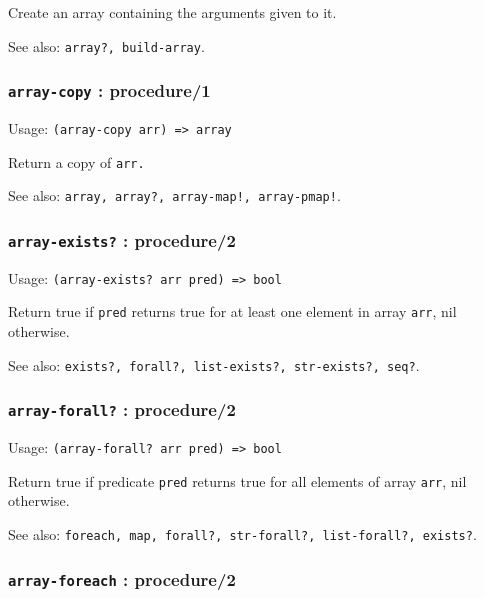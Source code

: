 \documentclass[
]{article}
\newcommand{\passthrough}[1]{#1}
\begin{document}
Create an array containing the arguments given to it.

See also: \passthrough{\lstinline!array?, build-array!}.

\hypertarget{array-copy-procedure1}{%
\subsubsection{\texorpdfstring{\texttt{array-copy} :
procedure/1}{array-copy : procedure/1}}\label{array-copy-procedure1}}

Usage: \passthrough{\lstinline!(array-copy arr) => array!}

Return a copy of \passthrough{\lstinline!arr.!}

See also:
\passthrough{\lstinline"array, array?, array-map!, array-pmap!"}.

\hypertarget{array-exists-procedure2}{%
\subsubsection{\texorpdfstring{\texttt{array-exists?} :
procedure/2}{array-exists? : procedure/2}}\label{array-exists-procedure2}}

Usage: \passthrough{\lstinline!(array-exists? arr pred) => bool!}

Return true if \passthrough{\lstinline!pred!} returns true for at least
one element in array \passthrough{\lstinline!arr!}, nil otherwise.

See also:
\passthrough{\lstinline!exists?, forall?, list-exists?, str-exists?, seq?!}.

\hypertarget{array-forall-procedure2}{%
\subsubsection{\texorpdfstring{\texttt{array-forall?} :
procedure/2}{array-forall? : procedure/2}}\label{array-forall-procedure2}}

Usage: \passthrough{\lstinline!(array-forall? arr pred) => bool!}

Return true if predicate \passthrough{\lstinline!pred!} returns true for
all elements of array \passthrough{\lstinline!arr!}, nil otherwise.

See also:
\passthrough{\lstinline!foreach, map, forall?, str-forall?, list-forall?, exists?!}.

\hypertarget{array-foreach-procedure2}{%
\subsubsection{\texorpdfstring{\texttt{array-foreach} :
procedure/2}{array-foreach : procedure/2}}\label{array-foreach-procedure2}}
\end{document}
